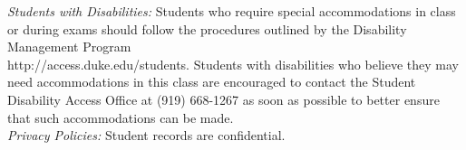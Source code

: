 \documentclass[11pt]{article}
\begin{document}
\emph{Students with Disabilities:} Students who require special accommodations in class or during exams should follow the procedures outlined by the Disability Management Program \\ http://access.duke.edu/students. Students with disabilities who believe they may need accommodations in this class are encouraged to contact the Student Disability Access Office at (919) 668-1267 as soon as possible to better ensure that such accommodations can be made. \\

\emph{Privacy Policies:} 
Student records are confidential.
\end{document}
